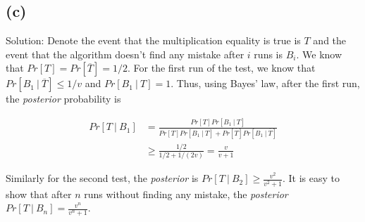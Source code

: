 \documentclass[10pt]{537homework}
\begin{document}
\subsection*{(c)} Solution: Denote the event that the multiplication equality is true is $T$ and the event that the algorithm doesn't find any mistake after $i$ runs is $B_i$. We know that $Pr[T] = Pr[\overline{T}] = 1/2$. For the first run of the test, we know that $Pr[B_1\:|\:
\overline{T}] \leq 1/v$ and $Pr[B_1\:|\:T]  = 1$. Thus, using Bayes' law, after the first run, the \textit{posterior} probability is 

\begin{align}
	Pr[T\:|\:B_1] & = \frac{Pr[T]Pr[B_1\:|\:T]}{Pr[T]Pr[B_1\:|\:T] + Pr[\overline{T}]Pr[B_1\:|\:\overline{T}]} \\
	& \geq \frac{1/2}{1/2 + 1/(2v) }  = \frac{v}{v+1}
\end{align}

Similarly for the second test, the \textit{posterior} is $Pr[T\:|\:B_2] \geq \frac{v^2}{v^2 + 1}$. It is easy to show that after $n$ runs without finding any mistake, the \textit{posterior} $Pr[T\:|\:B_n] = \frac{v^n}{v^n + 1}$. 
\end{document}
